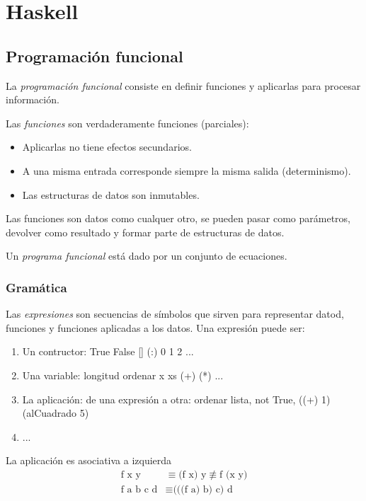 \documentclass[12pt]{extarticle}
\begin{document}
\section{Haskell}
\subsection{Programación funcional}
La \textit{programación funcional} consiste en definir funciones y aplicarlas para procesar información.

Las \textit{funciones} son verdaderamente funciones (parciales):
\begin{itemize}
\itemsep-0.35em 
\item Aplicarlas no tiene efectos secundarios.
\item A una misma entrada corresponde siempre la misma salida (determinismo).
\item Las estructuras de datos son inmutables.
\end{itemize}

Las funciones son datos como cualquer otro, se pueden pasar como parámetros, devolver como resultado y formar parte de estructuras de datos.

Un \textit{programa funcional} está dado por un conjunto de ecuaciones.

\subsubsection{Gramática}
Las \textit{expresiones} son secuencias de símbolos que sirven para representar datod, funciones y funciones aplicadas a los datos. Una expresión puede ser:

\begin{enumerate}
\itemsep-0.35em 
\item Un contructor: True False [] (:) 0 1 2 ...
\item Una variable: longitud ordenar x xs (+) (*) ...
\item La aplicación: de una expresión a otra: ordenar lista,  not True,  ((+) 1) (alCuadrado 5)
\item ...
\end{enumerate}

La aplicación es asociativa a izquierda
\begin{equation}
\begin{split}
\text{f x y} & \equiv \text{(f x) y} 
\not\equiv \text{f (x y)} \\
\text{f a b c d} & \equiv \text{(((f a) b) c) d}
\end{split}
\end{equation}
\end{document}
